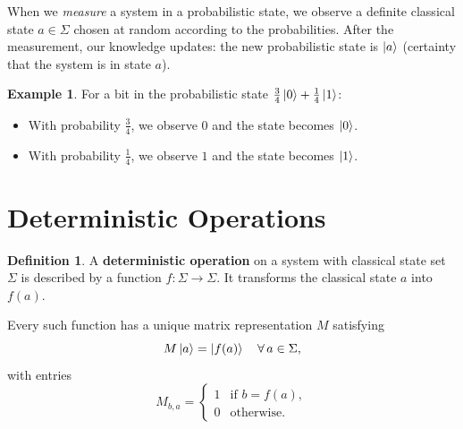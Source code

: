 \documentclass[11pt]{article}
\theoremstyle{definition}
\newtheorem{definition}{Definition}[section]
\newtheorem{example}{Example}[section]
\begin{document}
When we \emph{measure} a system in a probabilistic state, we observe a definite classical state $a\in\Sigma$ chosen at random according to the probabilities.  After the measurement, our knowledge updates: the new probabilistic state is $\ket{a}$ (certainty that the system is in state $a$).

\begin{example}
For a bit in the probabilistic state $\frac{3}{4}\ket{0}+\frac{1}{4}\ket{1}$:
\begin{itemize}
    \item With probability $\tfrac{3}{4}$, we observe $0$ and the state becomes $\ket{0}$.
    \item With probability $\tfrac{1}{4}$, we observe $1$ and the state becomes $\ket{1}$.
\end{itemize}
\end{example}

\section{Deterministic Operations}

\begin{definition}
A \textbf{deterministic operation} on a system with classical state set $\Sigma$ is described by a function $f:\Sigma\to\Sigma$.  It transforms the classical state $a$ into $f(a)$.
\end{definition}

Every such function has a unique matrix representation $M$ satisfying
\[
    M\ket{a} = \ket{f(a)} \quad \forall\, a\in\Sigma,
\]
with entries
\[
    M_{b,a} = \begin{cases} 1 & \text{if } b = f(a),\\ 0 & \text{otherwise}.\end{cases}
\]
\end{document}
